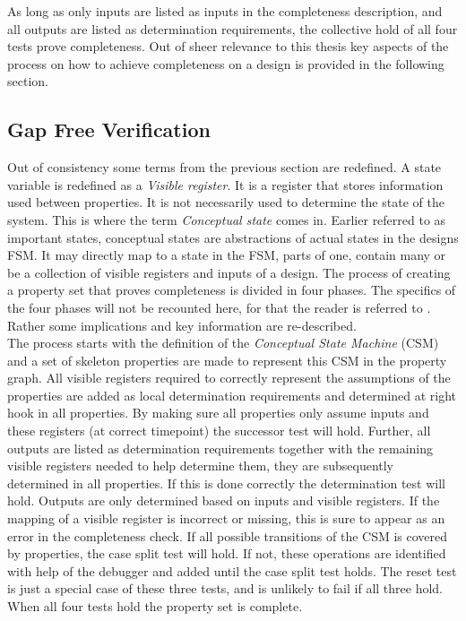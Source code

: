 As long as only inputs are listed as inputs in the completeness description, and all outputs are listed as determination requirements, the collective hold of all four tests prove completeness. Out of sheer relevance to this thesis key aspects of the process on how to achieve completeness on a design is provided in the following section. 

\subsection{Gap Free Verification}
\label{subsec:gfv}
Out of consistency some terms from the previous section are redefined. A state variable is redefined as a \textit{Visible register}. It is a register that stores information used between properties. It is not necessarily used to determine the state of the system. This is where the term \textit{Conceptual state} comes in. Earlier referred to as important states, conceptual states are abstractions of actual states in the designs FSM. It may directly map to a state in the FSM, parts of one,  contain many or be a collection of visible registers and inputs of a design. The process of creating a property set that proves completeness is divided in four phases. The specifics of the four phases will not be recounted here, for that the reader is referred to \cite{gapfree}. Rather some implications and key information are re-described. \\
\newline
The process starts with the definition of the \textit{Conceptual State Machine} (CSM) and a set of skeleton properties are made to represent this CSM in the property graph. All visible registers required to correctly represent the assumptions of the properties are added as local determination requirements and determined at right hook in all properties. By making sure all properties only assume inputs and these registers (at correct timepoint) the successor test will hold. Further, all outputs are listed as determination requirements together with the remaining visible registers needed to help determine them, they are subsequently determined in all properties. If this is done correctly the determination test will hold. Outputs are only determined based on inputs and visible registers. If the mapping of a visible register is incorrect or missing, this is sure to appear as an error in the completeness check. If all possible transitions of the CSM is covered by properties, the case split test will hold. If not, these operations are identified with help of the debugger and added until the case split test holds. The reset test is just a special case of these three tests, and is unlikely to fail if all three hold. When all four tests hold the property set is complete. 

